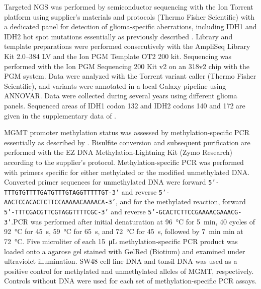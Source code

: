 Targeted \gls{NGS} was performed by semiconductor sequencing with the Ion Torrent platform using supplier's materials and protocols (Thermo Fisher Scientific) with a dedicated panel for detection of glioma-specific aberrations, including \gls{IDH}1 and \gls{IDH}2 hot spot mutations essentially as previously described \autocite{dubbink2015molecular}.
Library and template preparations were performed consecutively with the AmpliSeq Library Kit 2.0--384 LV and the Ion PGM Template OT2 200 kit.
Sequencing was performed with the Ion PGM Sequencing 200 Kit v2 on an 318v2 chip with the PGM system.
Data were analyzed with the Torrent variant caller (Thermo Fisher Scientific), and variants were annotated in a local Galaxy pipeline using ANNOVAR\@.
Data were collected during several years using different glioma panels.
Sequenced areas of \gls{IDH}1 codon 132 and \gls{IDH}2 codons 140 and 172 are given in the supplementary data of .

\gls{MGMT} promoter methylation status was assessed by methylation-specific PCR essentially as described by .
Bisulfite conversion and subsequent purification are performed with the EZ DNA Methylation-Lightning Kit (Zymo Research) according to the supplier's protocol.
Methylation-specific PCR was performed with primers specific for either methylated or the modified unmethylated DNA\@.
Converted primer sequences for unmethylated DNA were forward \linebreak[4]\texttt{5'-TTTGTGTTTTGATGTTTGTAGGTTTTTGT-3'} and reverse \linebreak[4]\texttt{5'-AACTCCACACTCTTCCAAAAACAAAACA-3'}, and for the methylated reaction, forward \linebreak[3]\texttt{5'-TTTCGACGTTCGTAGGTTTTCGC-3'} and reverse \linebreak[3]\texttt{5'-GCACTCTTCCGAAAACGAAACG-3'}\@.\linebreak[4]
PCR was performed after initial denaturation at \SI{96}{\celsius} for \SI{5}{\minute}, 40 cycles of \SI{92}{\celsius} for \SI{45}{\second}, \SI{59}{\celsius} for \SI{65}{\second}, and \SI{72}{\celsius} for \SI{45}{\second}, followed by \SI{7}{\minute} min at \SI{72}{\celsius}.
Five microliter of each \SI{15}{\micro\liter} methylation-specific PCR product was loaded onto a  agarose gel stained with GelRed (Biotium) and examined under ultraviolet illumination.
SW48 cell line DNA and tonsil DNA was used as a positive control for methylated and unmethylated alleles of \gls{MGMT}, respectively.
Controls without DNA were used for each set of methylation-specific PCR assays.


